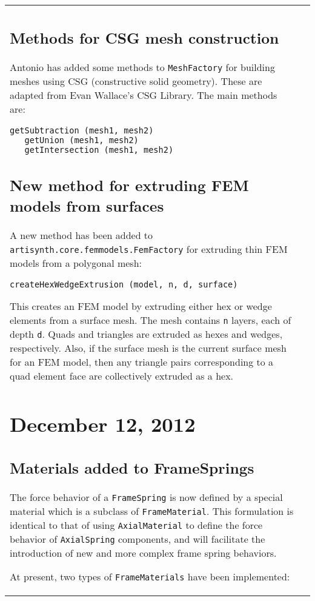 \documentclass{article}
\begin{document}
\begin{tabular}{ll}
\subsection*{Methods for CSG mesh construction}

Antonio has added some methods to {\tt MeshFactory} for building
meshes using CSG (constructive solid geometry). These are adapted from
Evan Wallace's CSG Library. The main methods are:
\begin{lstlisting}[]
   getSubtraction (mesh1, mesh2)
   getUnion (mesh1, mesh2)
   getIntersection (mesh1, mesh2)
\end{lstlisting}

\subsection*{New method for extruding FEM models from surfaces}

A new method has been added to {\tt artisynth.core.femmodels.FemFactory}
for extruding thin FEM models from a polygonal mesh:
\begin{lstlisting}[]
   createHexWedgeExtrusion (model, n, d, surface)
\end{lstlisting}
This creates an FEM model by extruding either hex or wedge elements
from a surface mesh. The mesh contains {\tt n} layers, each of depth
{\tt d}. Quads and triangles are extruded as hexes and wedges,
respectively.  Also, if the surface mesh is the current surface mesh
for an FEM model, then any triangle pairs corresponding to a quad
element face are collectively extruded as a hex.

\section*{December 12, 2012}

\subsection*{Materials added to FrameSprings}

The force behavior of a {\tt FrameSpring} is now defined by a special
material which is a subclass of {\tt FrameMaterial}. This formulation
is identical to that of using {\tt AxialMaterial} to define the force
behavior of {\tt AxialSpring} components, and will facilitate the
introduction of new and more complex frame spring behaviors.

At present, two types of {\tt FrameMaterials} have been implemented:


\end{tabular}
\end{document}
